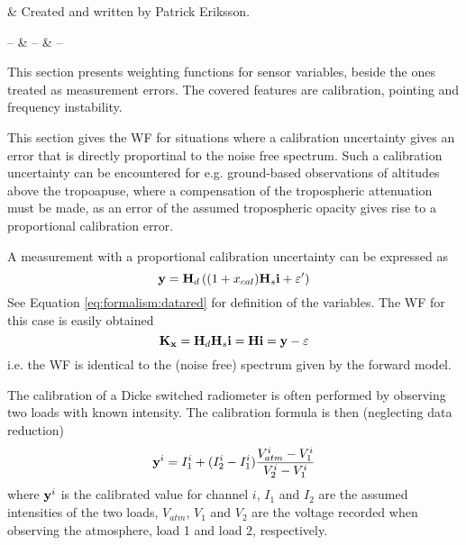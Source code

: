 %
%
 \label{sec:wfuns_sens}


%
%
 & Created and written by Patrick Eriksson.\\
\stophistory


%
%
%
\startsymbols
  -- & -- & -- \\
 \label{symtable:wfuns_sens}     
\stopsymbols



%
%
This section presents weighting functions for sensor variables, beside the
ones treated as measurement errors. The covered features are calibration,
pointing and frequency instability.




 \label{sec:wfuns_sens:cal}
 
 This section gives the WF for situations where a calibration
 uncertainty gives an error that is directly proportinal to the noise
 free spectrum.  Such a calibration uncertainty can be encountered for
 e.g. ground-based observations of altitudes above the tropoapuse,
 where a compensation of the tropospheric attenuation must be made, as an
 error of the assumed tropospheric opacity gives rise to a proportional 
 calibration error.

 A measurement with a proportional calibration uncertainty
 can be expressed as
 \begin{equation}
   \mathbf{y} = \mathbf{H}_d\left( (1+x_{cal})\mathbf{H}_s\mathbf{i}+\varepsilon' \right)
 \end{equation}
 See Equation \ref{eq:formalism:datared} for definition of the variables.
 The WF for this case is easily obtained
 \begin{equation}
   \mathbf{K}_{\mathbf{x}} = \mathbf{H}_d\mathbf{H}_s\mathbf{i} = \mathbf{H}\mathbf{i} = \mathbf{y} - \varepsilon
 \end{equation}
 i.e. the WF is identical to the (noise free) spectrum given by the forward
 model. 

 
 The calibration of a Dicke switched radiometer is often performed by
 observing two loads with known intensity. The calibration formula is
 then (neglecting data reduction)
 \begin{equation}
   \mathbf{y}^i =  I_1^i + (I_2^i-I_1^i)\frac{V_{atm}^i-V_1^i}{V_2^i-V_1^i} 
  \label{sec:wfuns_sens:loadcal}
 \end{equation}
 where $\mathbf{y}^i$ is the calibrated value for channel $i$, $I_1$ and $I_2$
 are the assumed intensities of the two loads, $V_{atm}$, $V_1$ and
 $V_2$ are the voltage recorded when observing the atmosphere, load 1
 and load 2, respectively.
 
